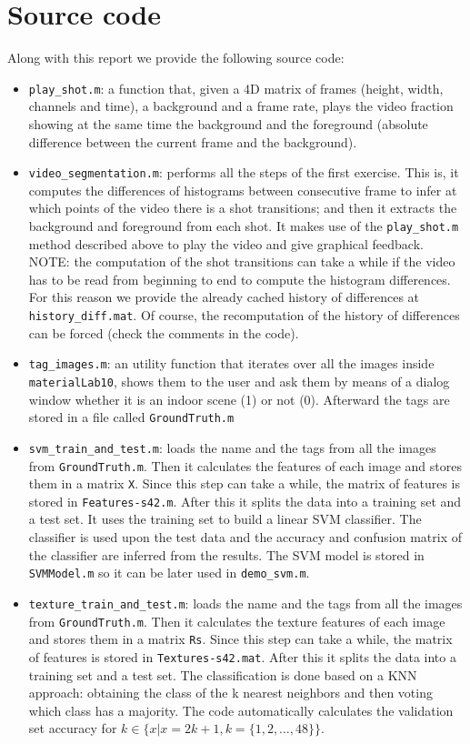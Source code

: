 \section{Source code}

Along with this report we provide the following source code:
\begin{itemize}
\item \texttt{play\_shot.m}: a function that, given a 4D matrix of frames (height, width, channels and time), a background and a frame rate, plays the video fraction showing at the same time the background and the foreground (absolute difference between the current frame and the background).
\item \texttt{video\_segmentation.m}: performs all the steps of the first exercise. This is, it computes the differences of histograms between consecutive frame to infer at which points of the video there is a shot transitions; and then it extracts the background and foreground from each shot. It makes use of the \texttt{play\_shot.m} method described above to play the video and give graphical feedback. NOTE: the computation of the shot transitions can take a while if the video has to be read from beginning to end to compute the histogram differences. For this reason we provide the already cached history of differences at \texttt{history\_diff.mat}. Of course, the recomputation of the history of differences can be forced (check the comments in the code).
\item \texttt{tag\_images.m}: an utility function that iterates over all the images inside \texttt{materialLab10}, shows them to the user and ask them by means of a dialog window whether it is an indoor scene (1) or not (0). Afterward the tags are stored in a file called \texttt{GroundTruth.m}
\item \texttt{svm\_train\_and\_test.m}: loads the name and the tags from all the images from \texttt{GroundTruth.m}. Then it calculates the features of each image and stores them in a matrix \texttt{X}. Since this step can take a while, the matrix of features is stored in \texttt{Features-s42.m}. After this it splits the data into a training set and a test set. It uses the training set to build a linear SVM classifier. The classifier is used upon the test data and the accuracy and confusion matrix of the classifier are inferred from the results. The SVM model is stored in \texttt{SVMModel.m} so it can be later used in \texttt{demo\_svm.m}.
\item \texttt{texture\_train\_and\_test.m}: loads the name and the tags from all the images from \texttt{GroundTruth.m}. Then it calculates the texture features of each image and stores them in a matrix \texttt{Rs}. Since this step can take a while, the matrix of features is stored in \texttt{Textures-s42.mat}. After this it splits the data into a training set and a test set. The classification is done based on a KNN approach: obtaining the class of the k nearest neighbors and then voting which class has a majority. The code automatically calculates the validation set accuracy for $k \in \{x | x = 2k + 1, k = \{1, 2, \ldots, 48 \}\} $.

\end{itemize}
